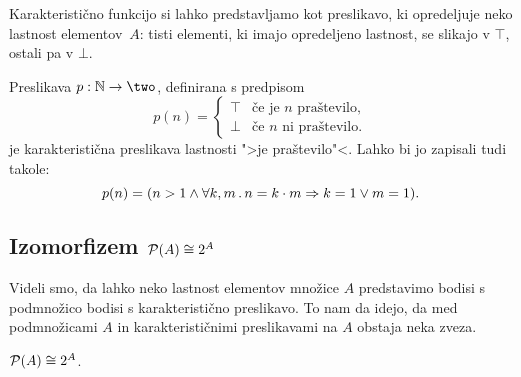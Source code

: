 Karakteristično funkcijo si lahko predstavljamo kot preslikavo, ki opredeljuje
neko lastnost elementov~$A$: tisti elementi, ki imajo opredeljeno lastnost, se
slikajo v $\top$, ostali pa v $\bot$.

\begin{primer}
  Preslikava $p : \NN \to \two$, definirana s predpisom
  \begin{equation*}
    p(n) = 
    \begin{cases}
      \top & \text{če je $n$ praštevilo}, \\
      \bot & \text{če $n$ ni praštevilo}.
    \end{cases}
  \end{equation*}
  je karakteristična preslikava lastnosti ">je praštevilo"<. Lahko bi jo zapisali tudi takole:
  \begin{equation*}
    p(n) = (n > 1 \land \forall k, m \,.\, n = k \cdot m \Rightarrow k = 1 \lor m = 1).
  \end{equation*}
\end{primer}


\subsection{Izomorfizem $\mathcal{P}(A) \cong 2^A$}

Videli smo, da lahko neko lastnost elementov množice $A$ predstavimo bodisi s
podmnožico bodisi s karakteristično preslikavo. To nam da idejo, da med
podmnožicami $A$ in karakterističnimi preslikavami na $A$ obstaja neka zveza.

\begin{izrek}
  $\mathcal{P}(A) \cong 2^A$.
\end{izrek}

